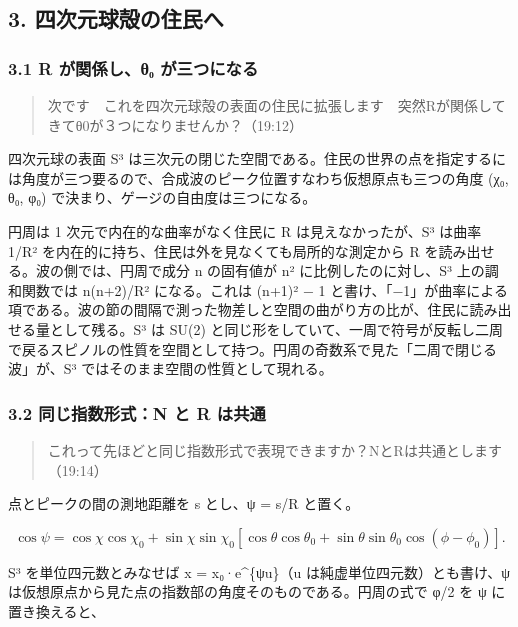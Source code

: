 \documentclass[
  a4paper,
]{ltjsarticle}
\begin{document}
\subsection{3.
四次元球殻の住民へ}\label{ux56dbux6b21ux5143ux7403ux6bbbux306eux4f4fux6c11ux3078}

\subsubsection{3.1 R が関係し、θ₀
が三つになる}\label{r-ux304cux95a2ux4fc2ux3057ux3b8ux2080-ux304cux4e09ux3064ux306bux306aux308b}

\begin{quote}
次です　これを四次元球殻の表面の住民に拡張します　突然Rが関係してきてθ0が３つになりませんか？（19:12）
\end{quote}

四次元球の表面 S³
は三次元の閉じた空間である。住民の世界の点を指定するには角度が三つ要るので、合成波のピーク位置すなわち仮想原点も三つの角度
(χ₀, θ₀, φ₀) で決まり、ゲージの自由度は三つになる。

円周は 1 次元で内在的な曲率がなく住民に R は見えなかったが、S³ は曲率
1/R² を内在的に持ち、住民は外を見なくても局所的な測定から R
を読み出せる。波の側では、円周で成分 n の固有値が n²
に比例したのに対し、S³ 上の調和関数では n(n+2)/R² になる。これは (n+1)²
− 1
と書け、「−1」が曲率による項である。波の節の間隔で測った物差しと空間の曲がり方の比が、住民に読み出せる量として残る。S³
は SU(2)
と同じ形をしていて、一周で符号が反転し二周で戻るスピノルの性質を空間として持つ。円周の奇数系で見た「二周で閉じる波」が、S³
ではそのまま空間の性質として現れる。

\subsubsection{3.2 同じ指数形式：N と R
は共通}\label{ux540cux3058ux6307ux6570ux5f62ux5f0fn-ux3068-r-ux306fux5171ux901a}

\begin{quote}
これって先ほどと同じ指数形式で表現できますか？NとRは共通とします（19:14）
\end{quote}

点とピークの間の測地距離を s とし、ψ = s/R と置く。

\[
\cos\psi=\cos\chi\cos\chi_0+\sin\chi\sin\chi_0\left[\cos\theta\cos\theta_0+\sin\theta\sin\theta_0\cos(\phi-\phi_0)\right].
\]

S³ を単位四元数とみなせば x = x₀·e\^{}\{ψu\}（u
は純虚単位四元数）とも書け、ψ
は仮想原点から見た点の指数部の角度そのものである。円周の式で φ/2 を ψ
に置き換えると、
\end{document}
